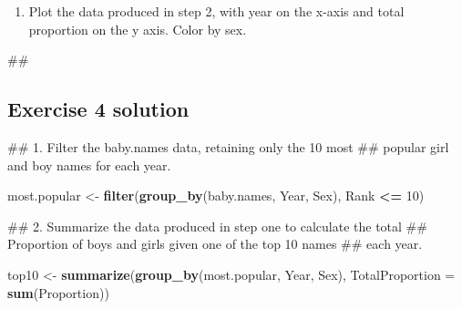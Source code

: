 \documentclass[]{book}
\newenvironment{Shaded}{\begin{snugshade}}{\end{snugshade}}
\newcommand{\KeywordTok}[1]{\textcolor[rgb]{0.13,0.29,0.53}{\textbf{#1}}}
\newcommand{\DataTypeTok}[1]{\textcolor[rgb]{0.13,0.29,0.53}{#1}}
\newcommand{\DecValTok}[1]{\textcolor[rgb]{0.00,0.00,0.81}{#1}}
\newcommand{\StringTok}[1]{\textcolor[rgb]{0.31,0.60,0.02}{#1}}
\newcommand{\OperatorTok}[1]{\textcolor[rgb]{0.81,0.36,0.00}{\textbf{#1}}}
\newcommand{\NormalTok}[1]{#1}
\providecommand{\tightlist}{%
  \setlength{\itemsep}{0pt}\setlength{\parskip}{0pt}}
\begin{document}
\begin{enumerate}
\def\labelenumi{\arabic{enumi}.}
\setcounter{enumi}{2}
\tightlist
\item
  Plot the data produced in step 2, with year on the x-axis and total
  proportion on the y axis. Color by sex.
\end{enumerate}

\begin{Shaded}
\begin{Highlighting}[]
\NormalTok{##}
\end{Highlighting}
\end{Shaded}

\subsection{Exercise 4 solution}\label{exercise-4-solution-1}

\begin{Shaded}
\begin{Highlighting}[]
\NormalTok{## 1.  Filter the baby.names data, retaining only the 10 most }
\NormalTok{##     popular girl and boy names for each year.}
\end{Highlighting}
\end{Shaded}

\begin{Shaded}
\begin{Highlighting}[]
\NormalTok{most.popular <-}\StringTok{ }\KeywordTok{filter}\NormalTok{(}\KeywordTok{group_by}\NormalTok{(baby.names, Year, Sex),}
\NormalTok{                       Rank }\OperatorTok{<=}\StringTok{ }\DecValTok{10}\NormalTok{)}
\end{Highlighting}
\end{Shaded}

\begin{Shaded}
\begin{Highlighting}[]
\NormalTok{## 2.  Summarize the data produced in step one to calculate the total}
\NormalTok{##     Proportion of boys and girls given one of the top 10 names}
\NormalTok{##     each year.}
\end{Highlighting}
\end{Shaded}

\begin{Shaded}
\begin{Highlighting}[]
\NormalTok{top10 <-}\StringTok{ }\KeywordTok{summarize}\NormalTok{(}\KeywordTok{group_by}\NormalTok{(most.popular, Year, Sex),}
                   \DataTypeTok{TotalProportion =} \KeywordTok{sum}\NormalTok{(Proportion))}
\end{Highlighting}
\end{Shaded}
\end{document}
